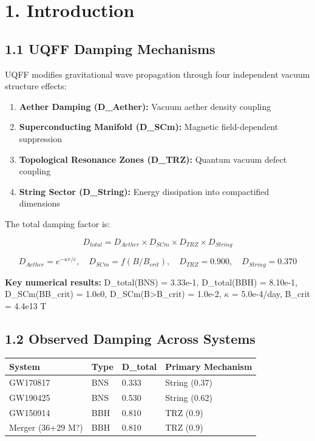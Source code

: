 \documentclass[11pt]{article}
\begin{document}
\section*{1. Introduction}

\subsection*{1.1 UQFF Damping Mechanisms}

UQFF modifies gravitational wave propagation through four independent vacuum structure effects:

\begin{enumerate}
  \item \textbf{Aether Damping (D\_Aether):} Vacuum aether density coupling
  \item \textbf{Superconducting Manifold (D\_SCm):} Magnetic field-dependent suppression
  \item \textbf{Topological Resonance Zones (D\_TRZ):} Quantum vacuum defect coupling
  \item \textbf{String Sector (D\_String):} Energy dissipation into compactified dimensions
\end{enumerate}

The total damping factor is:

$$D_{total} = D_{Aether} \times D_{SCm} \times D_{TRZ} \times D_{String}$$

$$D_{Aether} = e^{-\kappa r/c},\quad D_{SCm} = f(B/B_{crit}),\quad D_{TRZ} = 0.900,\quad D_{String} = 0.370$$

\textbf{Key numerical results:} D\_total(BNS) = 3.33e-1, D\_total(BBH) = 8.10e-1, D\_SCm(BB\_crit) = 1.0e0, D\_SCm(B>B\_crit) = 1.0e-2, $\kappa$ = 5.0e-4/day, B\_crit = 4.4e13 T

\subsection*{1.2 Observed Damping Across Systems}

\begin{center}
\begin{longtable}{llll}
\toprule
System & Type & D\_total & Primary Mechanism \tabularnewline
\midrule
\endhead
GW170817 & BNS & 0.333 & String (0.37) \tabularnewline
GW190425 & BNS & 0.530 & String (0.62) \tabularnewline
GW150914 & BBH & 0.810 & TRZ (0.9) \tabularnewline
Merger (36+29 M?) & BBH & 0.810 & TRZ (0.9) \tabularnewline
\bottomrule
\end{longtable}
\end{center}
\end{document}
